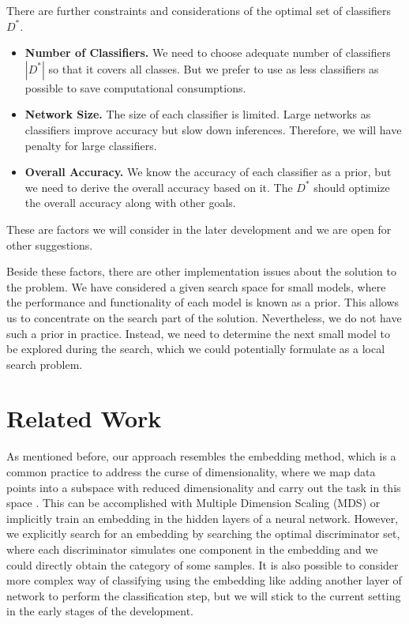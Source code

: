 \documentclass[acmsmall,nonacm]{acmart}\settopmatter{}
\begin{document}
There are further constraints and considerations of the optimal set of classifiers $D^*$.
\begin{itemize}
    \item \textbf{Number of Classifiers.} We need to choose adequate number of classifiers $|D^*|$ so that it covers all classes. But we prefer to use as less classifiers as possible to save computational consumptions.
    \item \textbf{Network Size.} The size of each classifier is limited. Large networks as classifiers improve accuracy but slow down inferences. Therefore, we will have penalty for large classifiers.
    \item \textbf{Overall Accuracy.} We know the accuracy of each classifier as a prior, but we need to derive the overall accuracy based on it. The $D^*$ should optimize the overall accuracy along with other goals.
\end{itemize}
These are factors we will consider in the later development and we are open for other suggestions.

Beside these factors, there are other implementation issues about the solution to the problem.
We have considered a given search space for small models, where the performance and functionality of each model is known as a prior.
This allows us to concentrate on the search part of the solution.
Nevertheless, we do not have such a prior in practice.
Instead, we need to determine the next small model to be explored during the search, which we could potentially formulate as a local search problem.

\section{Related Work}
As mentioned before, our approach resembles the embedding method, which is a common practice to address the curse of dimensionality, where we map data points into a subspace with reduced dimensionality and carry out the task in this space \cite{2016ml}.
This can be accomplished with Multiple Dimension Scaling (MDS) \cite{cox2000multidimensional} or implicitly train an embedding in the hidden layers of a neural network.
However, we explicitly search for an embedding by searching the optimal discriminator set, where each discriminator simulates one component in the embedding and we could directly obtain the category of some samples.
It is also possible to consider more complex way of classifying using the embedding like adding another layer of network to perform the classification step, but we will stick to the current setting in the early stages of the development.
\end{document}

